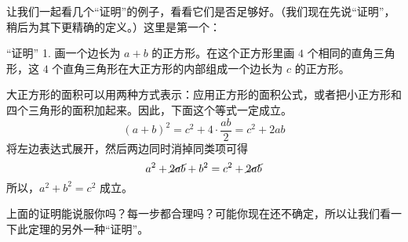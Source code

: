 让我们一起看几个``证明''的例子，看看它们是否足够好。（我们现在先说``证明''，稍后为其下更精确的定义。）这里是第一个：

\begin{proofs}{``证明'' 1.}
    画一个边长为 $a+b$ 的正方形。在这个正方形里画 $4$ 个相同的直角三角形，这 $4$ 个直角三角形在大正方形的内部组成一个边长为 $c$ 的正方形。

    \begin{center}
    \end{center}

    大正方形的面积可以用两种方式表示：应用正方形的面积公式，或者把小正方形和四个三角形的面积加起来。因此，下面这个等式一定成立。
    \[(a+b)^2=c^2+4\cdot\frac{ab}{2}=c^2+2ab\] 
    将左边表达式展开，然后两边同时消掉同类项可得 
    \[a^2+\cancel{2ab}+b^2=c^2+\cancel{2ab}\] 
    所以，$a^2+b^2=c^2$ 成立。
\end{proofs}

上面的证明能说服你吗？每一步都合理吗？可能你现在还不确定，所以让我们看一下此定理的另外一种``证明''。

